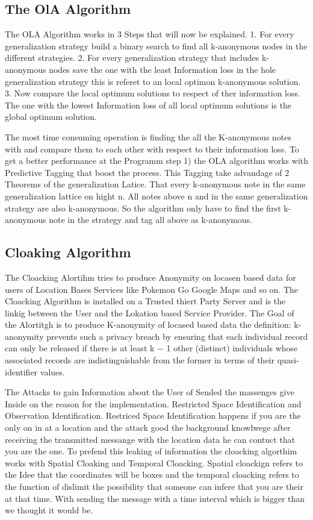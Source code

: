 \documentclass{llncs}
\begin{document}
\subsection{The OlA Algorithm }
The OLA Algorithm works in 3 Steps that will now be explained.
1.	For every generalization strategy build a binary search to find all k-anonymous nodes in the different strategies.
2.	For every generalization strategy that includes k-anonymous nodes save the one with the least Information loss in the hole generalization strategy this is referet to an local optimon k-anonymous solution.
3.	Now compare the local optimum solutions to respect of ther information loss. The one with the lowest Information loss of all local optimum solutions is  the global optimum solution.

The most time consuming operation is finding the all the K-anonymous notes with and compare them to each other with respect to their information loss.  To get a better performance at the Programm step 1) the OLA algorithm works with Predictive Tagging that boost the process.  This Tagging take advandage of 2 Theorems of the generalization Latice. That every k-anonymous note in the same generalization lattice on hight n. All notes above n and in the same generalization strategy are also k-anonymous. So the algorithm only have to find the first k-anonymous note in the strategy and tag all above as k-anonymous. 

\subsection{Cloaking Algorithm}
The Cloacking Alortihm tries to produce Anonymity on locasen based data for users of Location Bases Services like Pokemon Go Google Maps and so on. The Cloacking Algorithm is installed on a Trusted thiert Party Server and is the linkig between the User and the Lokation based Service Provider. The Goal of the Alortitgh is to produce K-anonymity of locased based data the definition: k-anonymity prevents such a privacy breach by ensuring that each individual record can only be released if there is at least k − 1 other (distinct) individuals whose associated records are indistinguishable from the former in terms of their quasi-identifier values.

The Attacks to gain Information about the User of Sended the massenges give Inside on the reason for the implementation. Restricted Space Identiﬁcation and Observation Identiﬁcation. Restriced Space Identification happens if you are the only on in at a location and the attack good the background knowlwege after receiving the transmitted messange with the location data he can contuct that you are the one. To prefend this leaking of information the cloacking algorthim works with Spatial Cloaking and Temporal Cloacking. Spatial cloackign refers to the Idee that the coordinates will be boxes and the temporal cloacking refers to the function of dislimit the possibility that someone can infere that you are their at that time. With sending the message with a time interval which is bigger than we thought it would be. 
\end{document}
